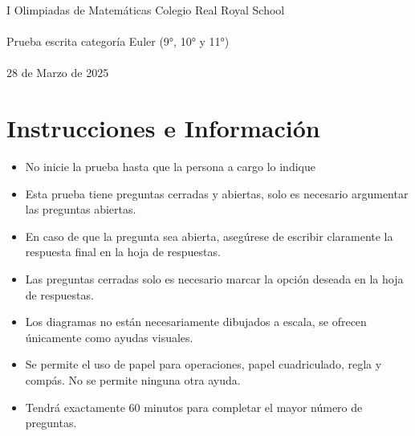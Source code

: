 \documentclass{article}
\begin{document}
\begin{center}
    \LARGE{I Olimpiadas de Matemáticas Colegio Real Royal School}
    \\~\\
    \large{Prueba escrita categoría Euler (9°, 10° y 11°)}
    \\~\\
    \large{28 de Marzo de 2025}
\end{center}
\section*{Instrucciones e Información}
\begin{itemize}
    \item No inicie la prueba hasta que la persona a cargo lo indique
    \item Esta prueba tiene preguntas cerradas y abiertas, solo es necesario argumentar las preguntas
          abiertas.
    \item En caso de que la pregunta sea abierta, asegúrese de escribir claramente la respuesta final en la hoja de respuestas.
    \item Las preguntas cerradas solo es necesario marcar la opción deseada en la hoja de respuestas.
    \item Los diagramas no están necesariamente dibujados a escala, se ofrecen únicamente como ayudas visuales.
    \item Se permite el uso de papel para operaciones, papel cuadriculado, regla y compás. No se
          permite ninguna otra ayuda.
    \item Tendrá exactamente 60 minutos para completar el mayor número de preguntas.
\end{itemize}
\end{document}
